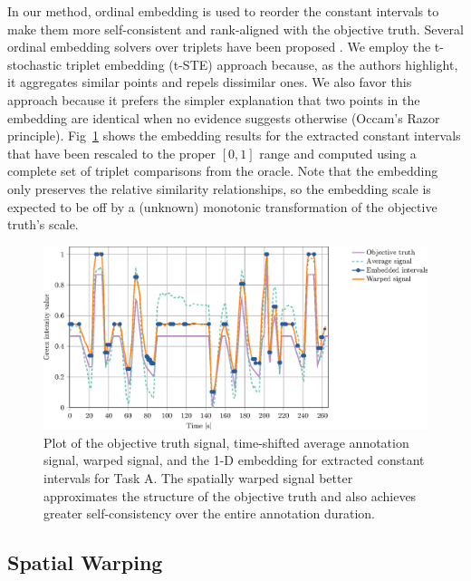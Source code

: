 \documentclass[10pt,letterpaper]{article}
\begin{document}
In our method, ordinal embedding is used to reorder the constant intervals to make them more self-consistent and rank-aligned with the objective truth.  Several ordinal embedding solvers over triplets have been proposed \cite{agarwal2007generalized, tamuz2011adaptively, van2012stochastic, amid2015multiview}.  We employ the t-stochastic triplet embedding (t-STE) approach \cite{van2012stochastic} because, as the authors highlight, it aggregates similar points and repels dissimilar ones.  We also favor this approach because it prefers the simpler explanation that two points in the embedding are identical when no evidence suggests otherwise (Occam's Razor principle).  Fig~\ref{Fig:warp_evaldep} shows the embedding results for the extracted constant intervals that have been rescaled to the proper $[0,1]$ range and computed using a complete set of triplet comparisons from the oracle.  Note that the embedding only preserves the relative similarity relationships, so the embedding scale is expected to be off by a (unknown) monotonic transformation of the objective truth's scale.

\begin{figure}
    \begin{adjustwidth}{-2.25in}{0in}
	\centering
    \includegraphics{images/Fig6.eps}
	\caption{Plot of the objective truth signal, time-shifted average annotation signal, warped signal, and the 1-D embedding for extracted constant intervals for Task A.  The spatially warped signal better approximates the structure of the objective truth and also achieves greater self-consistency over the entire annotation duration.}
	\label{Fig:warp_evaldep}
	\end{adjustwidth}
\end{figure}

\subsection*{Spatial Warping}
\end{document}

